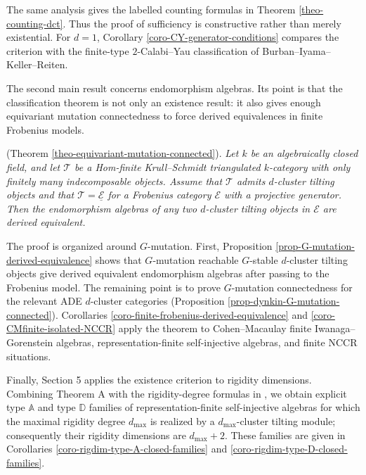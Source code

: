\documentclass[12pt]{article}
\theoremstyle{plain}
\theoremstyle{definition}
\begin{document}
\medskip
The same analysis gives the labelled counting formulas in Theorem
\ref{theo-counting-dct}.  Thus the proof of sufficiency is constructive rather
than merely existential.  For \(d=1\), Corollary
\ref{coro-CY-generator-conditions} compares the criterion with the
finite-type \(2\)-Calabi--Yau classification of
Burban--Iyama--Keller--Reiten.

The second main result concerns endomorphism algebras.  Its point is that the
classification theorem is not only an existence result: it also gives enough
equivariant mutation connectedness to force derived equivalences in finite
Frobenius models.

\medskip
{} (Theorem \ref{theo-equivariant-mutation-connected}). {\em 
Let $k$ be an algebraically closed field, and let \(\mathcal T\) be a Hom-finite Krull--Schmidt triangulated $k$-category
with only finitely many indecomposable objects.  Assume that \(\mathcal T\)
admits \(d\)-cluster tilting objects and that
\(\mathcal T=\underline{\mathcal E}\) for a Frobenius category \(\mathcal E\)
with a projective generator.  Then the endomorphism algebras of any two
\(d\)-cluster tilting objects  in \(\mathcal E\) are derived equivalent.}

\medskip

The proof is organized around \(G\)-mutation.  First, Proposition
\ref{prop-G-mutation-derived-equivalence} shows that \(G\)-mutation reachable
\(G\)-stable \(d\)-cluster tilting objects give derived equivalent
endomorphism algebras after passing to the Frobenius model.  The remaining
point is to prove  
\(G\)-mutation connectedness for the relevant ADE \(d\)-cluster categories
(Proposition \ref{prop-dynkin-G-mutation-connected}).  Corollaries
\ref{coro-finite-frobenius-derived-equivalence} and
\ref{coro-CMfinite-isolated-NCCR} apply the theorem to Cohen--Macaulay finite
Iwanaga--Gorenstein algebras, representation-finite self-injective algebras,
and finite NCCR situations.

Finally, Section 5 applies the existence criterion to rigidity dimensions.
Combining Theorem A with the rigidity-degree formulas in
\cite{HuYinRigidityDegrees}, we obtain explicit type \(\mathbb A\) and type
\(\mathbb D\) families of representation-finite self-injective algebras for
which the maximal rigidity degree \(d_{\max}\) is realized by a
\(d_{\max}\)-cluster tilting module; consequently their rigidity dimensions are
\(d_{\max}+2\).  These families are given in
Corollaries \ref{coro-rigdim-type-A-closed-families} and
\ref{coro-rigdim-type-D-closed-families}.
\end{document}
